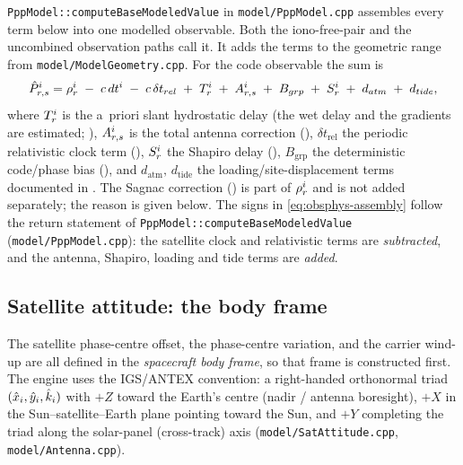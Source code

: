 \documentclass[main.tex]{subfiles}
\begin{document}
\texttt{PppModel::computeBaseModeledValue} in
\texttt{model/PppModel.cpp} assembles every term below into one modelled
observable.  Both the iono-free-pair and the uncombined observation
paths call it.  It adds the terms to the geometric range from
\texttt{model/ModelGeometry.cpp}.  For the code observable the sum is
\begin{equation}
\hat{P}^i_{r,s}
=
\rho^i_r
\;-\;c\,dt^i
\;-\;c\,\delta t_{rel}
\;+\;T^i_r
\;+\;A^i_{r,s}
\;+\;B_{grp}
\;+\;S^i_r
\;+\;d_{atm}
\;+\;d_{tide},
\label{eq:obsphys-assembly}
\end{equation}
where $T^i_r$ is the a~priori slant hydrostatic delay (the wet delay
and the gradients are estimated;
), $A^i_{r,s}$ is the total antenna correction
(), $\delta t_{\mathrm{rel}}$ the periodic
relativistic clock term (), $S^i_r$ the
Shapiro delay (), $B_{\mathrm{grp}}$ the
deterministic code/phase bias (), and
$d_{\mathrm{atm}},\,d_{\mathrm{tide}}$ the loading/site-displacement
terms documented in .  The Sagnac correction () is part of
$\rho^i_r$ and is not added separately; the reason is given
below.  The signs in \eqref{eq:obsphys-assembly} follow the return
statement of \texttt{PppModel::computeBaseModeledValue}
(\texttt{model/PppModel.cpp}): the satellite clock and relativistic terms
are \emph{subtracted}, and the antenna, Shapiro, loading and tide terms
are \emph{added}.

\subsection{Satellite attitude: the body frame}\label{sec:obsphys-attitude}

The satellite phase-centre offset, the phase-centre variation, and the
carrier wind-up are all defined in the \emph{spacecraft body frame}, so
that frame is constructed first.
The engine uses the IGS/ANTEX convention: a right-handed orthonormal
triad $(\hat{x}_i,\hat{y}_i,\hat{k}_i)$ with $+Z$ toward the Earth's centre
(nadir / antenna boresight), $+X$ in the Sun--satellite--Earth plane
pointing toward the Sun, and $+Y$ completing the triad along the solar-panel
(cross-track) axis (\texttt{model/SatAttitude.cpp},
\texttt{model/Antenna.cpp}).
\end{document}

